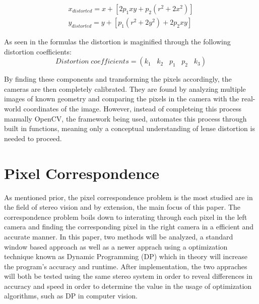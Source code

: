 \documentclass[11pt]{scrartcl}
\begin{document}
\begin{theorem}
    \begin{align}
        x_{distorted} = x + [ 2p_1xy + p_2(r^2+2x^2)]  
       \\ y_{distorted} = y + [ p_1(r^2+ 2y^2)+ 2p_2xy]
    \end{align}
    
\end{theorem}

As seen in the formulas the distortion is maginified through the following distortion coefficients: 
\begin{displaymath}
    Distortion \; coefficients=(k_1 \hspace{10pt} k_2 \hspace{10pt} p_1 \hspace{10pt} p_2 \hspace{10pt} k_3)
\end{displaymath}

By finding these components and transforming the pixels accordingly, the cameras are then 
completely calibrated. They are found by analyzing multiple images of known geometry and 
comparing the pixels in the camera with the real-world coordinates of the image. However, 
instead of completeing this process manually OpenCV, the framework being used, automates this 
process through built in functions, meaning only a conceptual understanding of lense distortion 
is needed to proceed. 

\section{Pixel Correspondence}

As mentioned prior, the pixel correspondence problem is the most studied are in the 
field of stereo vision and by extension, the main focus of this paper. The correspondence 
problem boils down to interating through each pixel in the left camera and finding the 
corresponding pixel in the right camera in a efficient and accurate manner. In this paper, 
two methods will be analyzed, a standard window based approach as well as a newer apprach 
using a optimization technique known as Dynamic Programming (DP) which in theory will increase 
the program's accuracy and runtime. After implementation, the 
two appraches will both be tested using the same stereo system in order to reveal differences 
in accuracy and speed in order to determine the value in the usage of optimization algorithms, 
such as DP in computer vision. 
\end{document}
